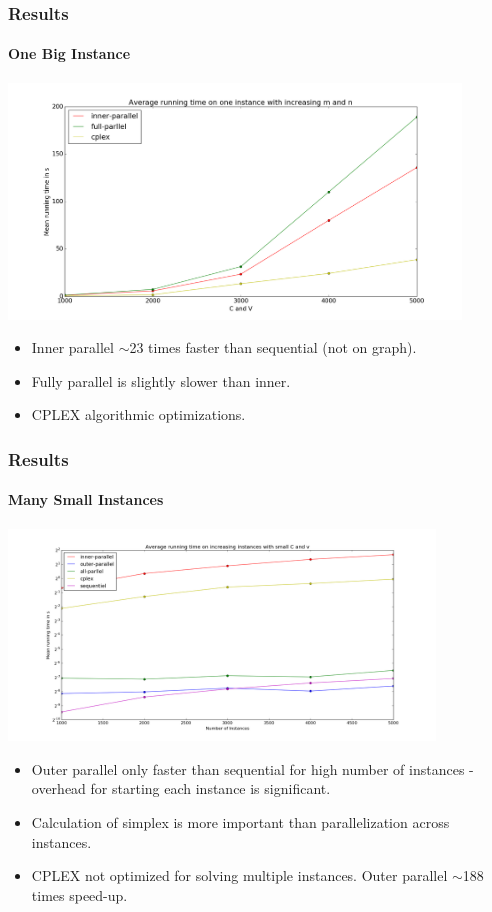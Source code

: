 \documentclass{beamer}
\begin{document}
\begin{frame}[fragile]
\frametitle{Results}
\framesubtitle{One Big Instance}
\centering
\includegraphics[width=0.9\textwidth]{../Doc/figures/one-big-new}
\begin{itemize}
	\item Inner parallel $\sim$23 times faster than sequential (not on graph).
	\item Fully parallel is slightly slower than inner.
	\item CPLEX algorithmic optimizations.
\end{itemize}
\end{frame}

\begin{frame}[fragile]
\frametitle{Results}
\framesubtitle{Many Small Instances}
\centering
\includegraphics[width=0.85\textwidth]{../Doc/figures/many-small}
\begin{itemize}
	\item Outer parallel only faster than sequential for high number of instances - overhead for starting each instance is significant.
	\item Calculation of simplex is more important than parallelization across instances.
	\item CPLEX not optimized for solving multiple instances. Outer parallel $\sim$188 times speed-up.
\end{itemize}
\end{frame}
\end{document}
